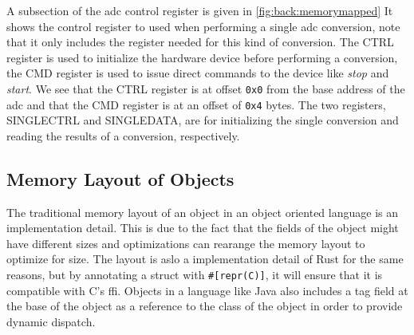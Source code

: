 A subsection of the \gls{adc} control register is given in \autoref{fig:back:memorymapped}
It shows the control register to used when performing a single \gls{adc} conversion, note that it only includes the register needed for this kind of conversion.
The CTRL register is used to initialize the hardware device before performing a conversion, the CMD register is used to issue direct commands to the device like \emph{stop} and \emph{start}.
We see that the CTRL register is at offset \texttt{0x0} from the base address of the \gls{adc} and that the CMD register is at an offset of \texttt{0x4} bytes.
The two registers, SINGLECTRL and SINGLEDATA, are for initializing the single conversion and reading the results of a conversion, respectively.

\subsection{Memory Layout of Objects}

The traditional memory layout of an object in an object oriented language is an implementation detail.
This is due to the fact that the fields of the object might have different sizes and optimizations can rearange the memory layout to optimize for size.
The layout is aslo a implementation detail of Rust for the same reasons, but by annotating a struct with \texttt{\#[repr(C)]}, it will ensure that it is compatible with C's \gls{ffi}.
Objects in a language like Java also includes a tag field at the base of the object as a reference to the class of the object in order to provide dynamic dispatch.

